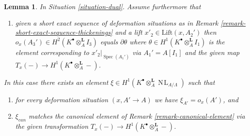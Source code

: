 \documentclass{stacks-project}
\theoremstyle{plain}
\newtheorem{lemma}[subsection]{Lemma}
\theoremstyle{definition}
\theoremstyle{remark}
\numberwithin{equation}{subsection}
\def\Spec{\mathop{\mathrm{Spec}}}
\def\NL{\mathop{N\!L}\nolimits}
\begin{document}
\begin{lemma}
\label{lemma-dual-obstruction}
In Situation \ref{situation-dual}. Assume furthermore that
\begin{enumerate}
\item[(iv)] given a short exact sequence of deformation situations
as in Remark \ref{remark-short-exact-sequence-thickenings} and
a lift $x'_2 \in \text{Lift}(x, A_2')$ then
$o_x(A_3') \in H^2(K^\bullet \otimes_A^\mathbf{L} I_3)$
equals $\partial\theta$ where
$\theta \in H^1(K^\bullet \otimes_A^\mathbf{L} I_1)$
is the element corresponding to $x'_2|_{\Spec(A_1')}$ via
$A_1' = A[I_1]$ and the given map
$T_x(-) \to H^1(K^\bullet \otimes_A^\mathbf{L} -)$.
\end{enumerate}
In this case there exists an element
$\xi \in H^1(K^\bullet \otimes_A^\mathbf{L} \NL_{A/\Lambda})$
such that
\begin{enumerate}
\item for every deformation situation $(x, A' \to A)$ we have
$\xi_{A'} = o_x(A')$, and
\item $\xi_{can}$ matches the canonical element of
Remark \ref{remark-canonical-element} via the given transformation
$T_x(-) \to H^1(K^\bullet \otimes_A^\mathbf{L} -)$.
\end{enumerate}
\end{lemma}
\end{document}
